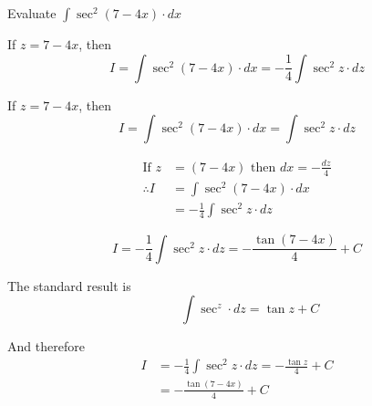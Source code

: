 \documentclass[14pt,fleqn]{extarticle}
\begin{document}
\newcommand\ea{ \left( 7-4x\right)}
Evaluate $\int \sec^2 \left(7-4x \right)\cdot dx$ 

\newcard 

If $z = 7-4x$, then 
\[ I = \int \sec^2 \ea\cdot dx = -\frac{1}{4}\int \sec^2 z\cdot dz \]
%
\newcard 

If $z = 7-4x$, then 
\[ I = \int \sec^2 \ea\cdot dx = \int \sec^2 z\cdot dz \]

\newcard 

\begin{align}
	\text{If } z &= \ea\text{ then } dx = -\frac{dz}{4} \\
	\therefore I &= \int \sec^2 \ea\cdot dx \\
	&= -\frac{1}{4}\int \sec^2 z \cdot dz 
\end{align}

\newcard 

\[ I = -\frac{1}{4}\int\sec^2 z\cdot dz = -\frac{\tan \ea}{4} + C \]

\newcard 

The standard result is \[\qquad \int \sec^z\cdot dz = \tan z + C\]

And therefore 
\begin{align}
	I &= -\frac{1}{4}\int \sec^2 z\cdot dz = -\frac{\tan z}{4} + C \\ 
	&= -\frac{\tan \ea}{4} + C 
\end{align}
\end{document}
